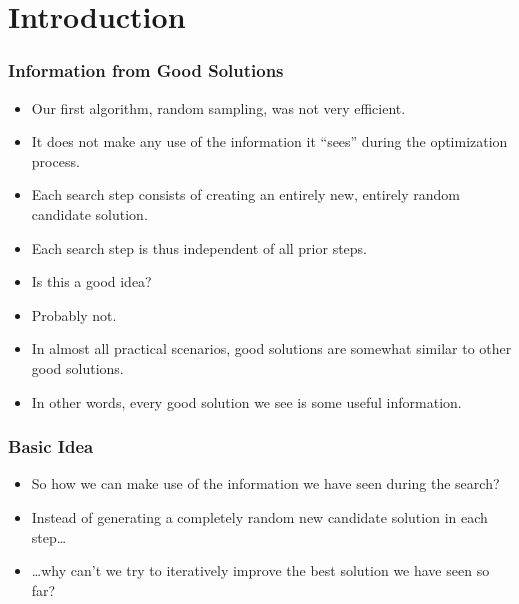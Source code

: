 \documentclass[mathserif]{beamer}%
\subtitle{5. Stochastic Hill Climbing}%
\begin{document}
%
\startPresentation%
%
\section{Introduction}%
%
\begin{frame}%
\frametitle{Information from Good Solutions}%
\begin{itemize}%
\item Our first algorithm, random sampling, was not very efficient.
\item<2-> It does not make any use of the information it ``sees'' during the optimization process.%
\item<3-> Each search step consists of creating an entirely new, entirely random candidate solution.%
\item<4-> Each search step is thus independent of all prior steps.%
\item<5-> \alert{Is this a good idea?}%
\item<6-> Probably not.%
\item<7-> In almost all practical scenarios, good solutions are somewhat similar to other good solutions.%
\item<8-> In other words, every good solution we see is some useful information.%
\end{itemize}%
\end{frame}%
%
\begin{frame}[t]%
\frametitle{Basic Idea}%
\begin{itemize}%
\item So how we can make use of the information we have seen during the search?%
\item<3-> Instead of generating a completely random new candidate solution in each step\dots%
\item<4-> {\dots}why can't we try to iteratively improve the best solution we have seen so far?%
\end{itemize}%
\end{frame}%
%
\end{document}
